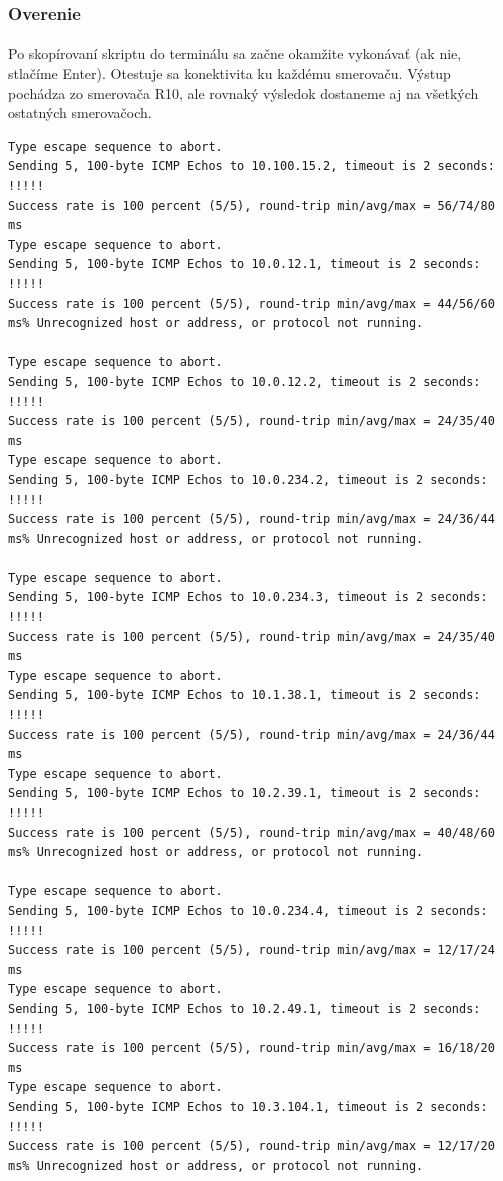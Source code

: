\documentclass[12pt,twoside,a4paper]{report}
\begin{document}
\subsubsection{Overenie}
\paragraph{}
Po skopírovaní skriptu do terminálu sa začne okamžite vykonávať (ak nie, stlačíme Enter). Otestuje sa konektivita ku každému smerovaču. Výstup pochádza zo smerovača R10, ale rovnaký výsledok dostaneme aj na všetkých ostatných smerovačoch.


\noindent
{\selectfont
\begin{small}
\begin{verbatim}
Type escape sequence to abort.
Sending 5, 100-byte ICMP Echos to 10.100.15.2, timeout is 2 seconds:
!!!!!
Success rate is 100 percent (5/5), round-trip min/avg/max = 56/74/80 ms
Type escape sequence to abort.
Sending 5, 100-byte ICMP Echos to 10.0.12.1, timeout is 2 seconds:
!!!!!
Success rate is 100 percent (5/5), round-trip min/avg/max = 44/56/60 ms% Unrecognized host or address, or protocol not running.

Type escape sequence to abort.
Sending 5, 100-byte ICMP Echos to 10.0.12.2, timeout is 2 seconds:
!!!!!
Success rate is 100 percent (5/5), round-trip min/avg/max = 24/35/40 ms
Type escape sequence to abort.
Sending 5, 100-byte ICMP Echos to 10.0.234.2, timeout is 2 seconds:
!!!!!
Success rate is 100 percent (5/5), round-trip min/avg/max = 24/36/44 ms% Unrecognized host or address, or protocol not running.

Type escape sequence to abort.
Sending 5, 100-byte ICMP Echos to 10.0.234.3, timeout is 2 seconds:
!!!!!
Success rate is 100 percent (5/5), round-trip min/avg/max = 24/35/40 ms
Type escape sequence to abort.
Sending 5, 100-byte ICMP Echos to 10.1.38.1, timeout is 2 seconds:
!!!!!
Success rate is 100 percent (5/5), round-trip min/avg/max = 24/36/44 ms
Type escape sequence to abort.
Sending 5, 100-byte ICMP Echos to 10.2.39.1, timeout is 2 seconds:
!!!!!
Success rate is 100 percent (5/5), round-trip min/avg/max = 40/48/60 ms% Unrecognized host or address, or protocol not running.

Type escape sequence to abort.
Sending 5, 100-byte ICMP Echos to 10.0.234.4, timeout is 2 seconds:
!!!!!
Success rate is 100 percent (5/5), round-trip min/avg/max = 12/17/24 ms
Type escape sequence to abort.
Sending 5, 100-byte ICMP Echos to 10.2.49.1, timeout is 2 seconds:
!!!!!
Success rate is 100 percent (5/5), round-trip min/avg/max = 16/18/20 ms
Type escape sequence to abort.
Sending 5, 100-byte ICMP Echos to 10.3.104.1, timeout is 2 seconds:
!!!!!
Success rate is 100 percent (5/5), round-trip min/avg/max = 12/17/20 ms% Unrecognized host or address, or protocol not running.


\end{verbatim}
\end{small}}
\end{document}
